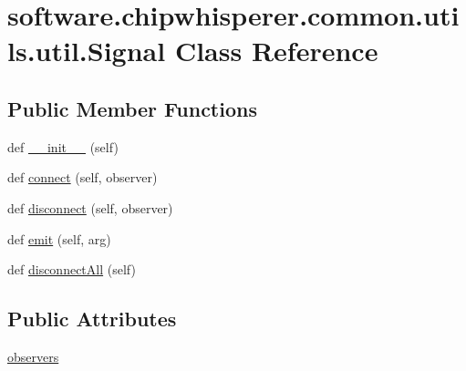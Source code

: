 \hypertarget{classsoftware_1_1chipwhisperer_1_1common_1_1utils_1_1util_1_1Signal}{}\section{software.\+chipwhisperer.\+common.\+utils.\+util.\+Signal Class Reference}
\label{classsoftware_1_1chipwhisperer_1_1common_1_1utils_1_1util_1_1Signal}
\subsection*{Public Member Functions}
\begin{DoxyCompactItemize}
\item 
def \hyperlink{classsoftware_1_1chipwhisperer_1_1common_1_1utils_1_1util_1_1Signal_aa4a43f8400cdd70691bedd5d882436e0}{\+\_\+\+\_\+init\+\_\+\+\_\+} (self)
\item 
def \hyperlink{classsoftware_1_1chipwhisperer_1_1common_1_1utils_1_1util_1_1Signal_a1a82fb018040f1e3e62fdedd3c442d13}{connect} (self, observer)
\item 
def \hyperlink{classsoftware_1_1chipwhisperer_1_1common_1_1utils_1_1util_1_1Signal_a2d9c0ce3972742c4fdb3b1abf67cfdd3}{disconnect} (self, observer)
\item 
def \hyperlink{classsoftware_1_1chipwhisperer_1_1common_1_1utils_1_1util_1_1Signal_a009e00d2f3a00b5252378538b912d930}{emit} (self, arg)
\item 
def \hyperlink{classsoftware_1_1chipwhisperer_1_1common_1_1utils_1_1util_1_1Signal_ac2efc23a79299298de60764324df9113}{disconnect\+All} (self)
\end{DoxyCompactItemize}
\subsection*{Public Attributes}
\begin{DoxyCompactItemize}
\item 
\hyperlink{classsoftware_1_1chipwhisperer_1_1common_1_1utils_1_1util_1_1Signal_abe718068c66b3b7d9e3e94091df6f457}{observers}
\end{DoxyCompactItemize}


